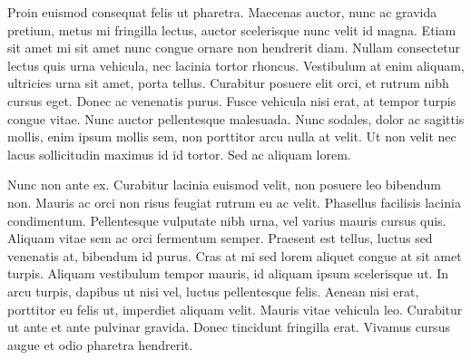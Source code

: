 Proin euismod consequat felis ut pharetra. Maecenas auctor, nunc ac gravida pretium, metus mi fringilla lectus, auctor scelerisque nunc velit id magna. Etiam sit amet mi sit amet nunc congue ornare non hendrerit diam. Nullam consectetur lectus quis urna vehicula, nec lacinia tortor rhoncus. Vestibulum at enim aliquam, ultricies urna sit amet, porta tellus. Curabitur posuere elit orci, et rutrum nibh cursus eget. Donec ac venenatis purus. Fusce vehicula nisi erat, at tempor turpis congue vitae. Nunc auctor pellentesque malesuada. Nunc sodales, dolor ac sagittis mollis, enim ipsum mollis sem, non porttitor arcu nulla at velit. Ut non velit nec lacus sollicitudin maximus id id tortor. Sed ac aliquam lorem.

Nunc non ante ex. Curabitur lacinia euismod velit, non posuere leo bibendum non. Mauris ac orci non risus feugiat rutrum eu ac velit. Phasellus facilisis lacinia condimentum. Pellentesque vulputate nibh urna, vel varius mauris cursus quis. Aliquam vitae sem ac orci fermentum semper. Praesent est tellus, luctus sed venenatis at, bibendum id purus. Cras at mi sed lorem aliquet congue at sit amet turpis. Aliquam vestibulum tempor mauris, id aliquam ipsum scelerisque ut. In arcu turpis, dapibus ut nisi vel, luctus pellentesque felis. Aenean nisi erat, porttitor eu felis ut, imperdiet aliquam velit. Mauris vitae vehicula leo. Curabitur ut ante et ante pulvinar gravida. Donec tincidunt fringilla erat. Vivamus cursus augue et odio pharetra hendrerit.
